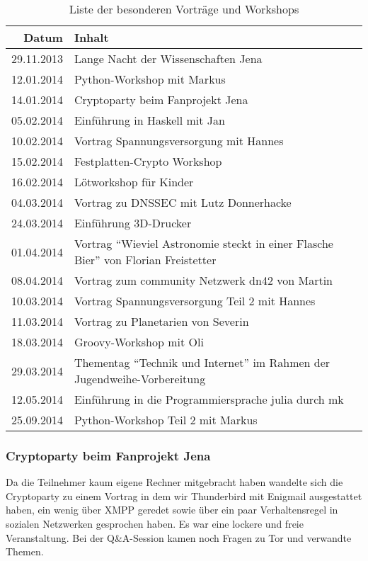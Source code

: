 \documentclass[ngerman]{scrartcl}
\begin{document}
\begin{table}[h]
  \centering{}
  \begin{tabular}{r|l}
	\textbf{Datum} & \textbf{Inhalt} \\ \midrule
	29.11.2013 & Lange Nacht der Wissenschaften Jena \\
	12.01.2014 & Python-Workshop mit Markus \\
	14.01.2014 & Cryptoparty beim Fanprojekt Jena \\
	05.02.2014 & Einführung in Haskell mit Jan \\
	10.02.2014 & Vortrag Spannungsversorgung mit Hannes \\
	15.02.2014 & Festplatten-Crypto Workshop \\
	16.02.2014 & Lötworkshop für Kinder \\
	04.03.2014 & Vortrag zu DNSSEC mit Lutz Donnerhacke \\
	24.03.2014 & Einführung 3D-Drucker \\
	01.04.2014 & Vortrag "`Wieviel Astronomie steckt in einer Flasche Bier"' von Florian Freistetter \\
	08.04.2014 & Vortrag zum community Netzwerk dn42 von Martin \\
	10.03.2014 & Vortrag Spannungsversorgung Teil 2 mit Hannes \\
	11.03.2014 & Vortrag zu Planetarien von Severin \\
	18.03.2014 & Groovy-Workshop mit Oli \\
	29.03.2014 & Thementag "`Technik und Internet"' im Rahmen der Jugendweihe-Vorbereitung \\
	12.05.2014 & Einführung in die Programmiersprache julia durch mk \\
	25.09.2014 & Python-Workshop Teil 2 mit Markus \\
	\end{tabular}
	\caption{Liste der besonderen Vorträge und Workshops}
\end{table}

\subsubsection{Cryptoparty beim Fanprojekt Jena}

Da die Teilnehmer kaum eigene Rechner mitgebracht haben wandelte sich die
Cryptoparty zu einem Vortrag in dem wir Thunderbird mit Enigmail ausgestattet
haben, ein wenig über XMPP geredet sowie über ein paar Verhaltensregel in
sozialen Netzwerken gesprochen haben. Es war eine lockere und freie
Veranstaltung. Bei der Q\&A-Session kamen noch Fragen zu Tor und verwandte
Themen.
\end{document}
